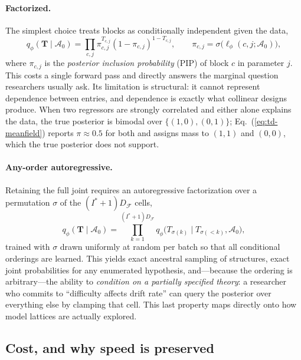 \documentclass[11pt]{article}
\newcommand{\rmT}{\mathbf{T}}
\providecommand{\cref}[1]{Eq.~(\ref{#1})}
\begin{document}
\paragraph{Factorized.} The simplest choice treats blocks as conditionally
independent given the data,
%
\begin{equation}
\label{eq:td-meanfield}
q_\phi(\rmT \mid \mathcal{A}_0) = \prod_{c,j} \pi_{c,j}^{T_{c,j}} (1-\pi_{c,j})^{1-T_{c,j}},
\qquad \pi_{c,j} = \sigma\!\big(\ell_\phi(c,j;\mathcal{A}_0)\big),
\end{equation}
%
where $\pi_{c,j}$ is the \emph{posterior inclusion probability} (PIP) of block $c$ in
parameter $j$. This costs a single forward pass and directly answers the marginal
question researchers usually ask. Its limitation is structural: it cannot represent
dependence between entries, and dependence is exactly what collinear designs produce.
When two regressors are strongly correlated and either alone explains the data, the
true posterior is bimodal over $\{(1,0),(0,1)\}$; \cref{eq:td-meanfield} reports
$\pi \approx 0.5$ for both and assigns mass to $(1,1)$ and $(0,0)$, which the true
posterior does not support.

\paragraph{Any-order autoregressive.} Retaining the full joint requires an
autoregressive factorization over a permutation $\sigma$ of the $(I^\ast+1)D_\mathcal{F}$
cells,
%
\begin{equation}
\label{eq:td-aoar}
q_\phi(\rmT \mid \mathcal{A}_0) = \prod_{k=1}^{(I^\ast+1)D_\mathcal{F}}
q_\phi\big(T_{\sigma(k)} \mid T_{\sigma(<k)}, \mathcal{A}_0\big),
\end{equation}
%
trained with $\sigma$ drawn uniformly at random per batch so that all conditional
orderings are learned. This yields exact ancestral sampling of structures, exact joint
probabilities for any enumerated hypothesis, and---because the ordering is
arbitrary---the ability to \emph{condition on a partially specified theory}: a
researcher who commits to ``difficulty affects drift rate'' can query the posterior
over everything else by clamping that cell. This last property maps directly onto how
model lattices are actually explored.

\subsection{Cost, and why speed is preserved}
\end{document}

